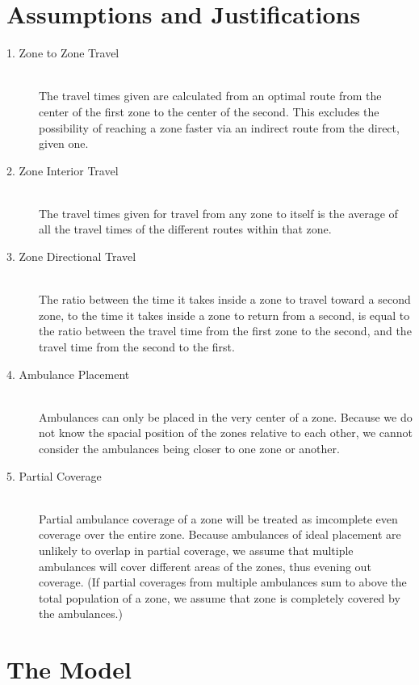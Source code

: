 \documentclass[notitlepage, 12pt]{article}
\begin{document}
\section{Assumptions and Justifications}
\begin{description}
    \item[1. Zone to Zone Travel] \hfill \\
    	The travel times given are calculated from an optimal route from the center of the first
        zone to the center of the second. This excludes the possibility of reaching a zone faster
        via an indirect route from the direct, given one.
    \item[2. Zone Interior Travel] \hfill \\
    	The travel times given for travel from any zone to itself is the average
        of all the travel times of the different routes within that zone.
    \item[3. Zone Directional Travel] \hfill \\
    	The ratio between the time it takes inside a zone to travel toward a second zone,
        to the time it takes inside a zone to return from a second, is equal to the ratio
        between the travel time from the first zone to the second, and the travel time from the
        second to the first.
    \item[4. Ambulance Placement] \hfill \\
        Ambulances can only be placed in the very center of a zone. Because we do not know the
        spacial position of the zones relative to each other, we cannot consider the ambulances
        being closer to one zone or another.
    \item[5. Partial Coverage] \hfill \\
        Partial ambulance coverage of a zone will be treated as imcomplete even coverage over the entire
        zone. Because ambulances of ideal placement are unlikely to overlap in partial coverage, we assume
        that multiple ambulances will cover different areas of the zones, thus evening out coverage. (If partial coverages from multiple ambulances sum to above the total population of a zone,
        we assume that zone is completely covered by the ambulances.)
\end{description}

\section{The Model}
\end{document}
